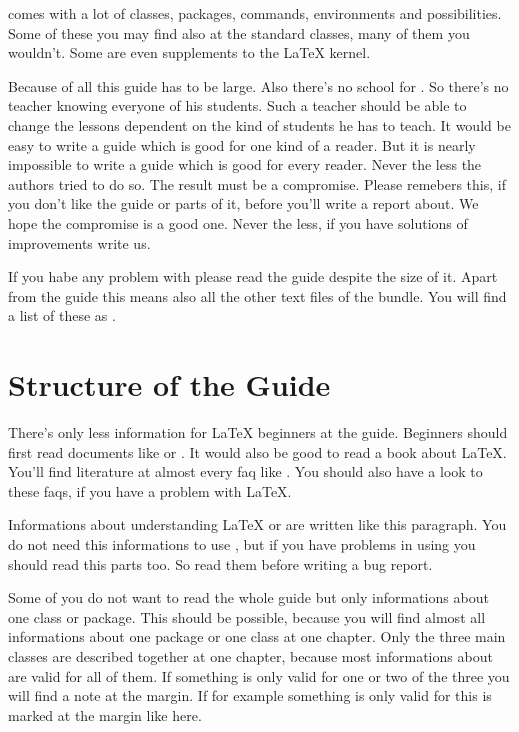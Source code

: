 \KOMAScript{} comes with a lot of classes, packages, commands,
environments and possibilities. Some of these you may find also at the
standard classes, many of them you wouldn't. Some are even supplements to
the \LaTeX{} kernel.

Because of all this \KOMAScript{} guide has to be large. Also there's
no school for \KOMAScript. So there's no teacher knowing everyone of
his students. Such a teacher should be able to change the lessons
dependent on the kind of students he has to teach. It would be easy to
write a guide which is good for one kind of a reader. But it is nearly
impossible to write a guide which is good for every reader. Never the
less the authors tried to do so. The result must be a
compromise. Please remebers this, if you don't like the guide or
parts of it, before you'll write a report about. We hope the
compromise is a good one. Never the less, if you have solutions of
improvements write us.

If you habe any problem with \KOMAScript{} please read the guide
despite the size of it. Apart from the guide this means also all the
other text files of the bundle. You will find a list of these as
.


\section{Structure of the Guide}\label{sec:introduction.structure}

There's only less information for \LaTeX{} beginners at the guide.
Beginners should first read documents like \cite{lshort} or
\cite{latex:usrguide}. It would also be good to read a book about
\LaTeX. You'll find literature at almost every faq like \cite{UK:FAQ}.
You should also have a look to these faqs, if you have a problem with
\LaTeX{}.

\begin{Explain}
  Informations about understanding \LaTeX{} or \KOMAScript{} are
  written like this paragraph. You do not need this informations to
  use \KOMAScript{}, but if you have problems in using \KOMAScript you
  should read this parts too. So read them before writing a bug
  report.
\end{Explain}

Some of you do not want to read the whole guide but only informations
about one class or package. This should be possible, because you will
find almost all informations about one package or one class at one
chapter. Only the three main classes are described together at one
chapter, because most informations about are valid for all of them. If
something is only valid for one or two of the three you will find a
note at the margin. If for example something is only valid for
 this is marked at the
margin like here.


